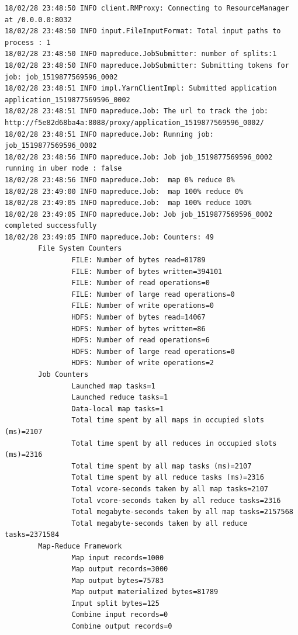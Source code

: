 \begin{lstlisting}
18/02/28 23:48:50 INFO client.RMProxy: Connecting to ResourceManager at /0.0.0.0:8032
18/02/28 23:48:50 INFO input.FileInputFormat: Total input paths to process : 1
18/02/28 23:48:50 INFO mapreduce.JobSubmitter: number of splits:1
18/02/28 23:48:50 INFO mapreduce.JobSubmitter: Submitting tokens for job: job_1519877569596_0002
18/02/28 23:48:51 INFO impl.YarnClientImpl: Submitted application application_1519877569596_0002
18/02/28 23:48:51 INFO mapreduce.Job: The url to track the job: http://f5e82d68ba4a:8088/proxy/application_1519877569596_0002/
18/02/28 23:48:51 INFO mapreduce.Job: Running job: job_1519877569596_0002
18/02/28 23:48:56 INFO mapreduce.Job: Job job_1519877569596_0002 running in uber mode : false
18/02/28 23:48:56 INFO mapreduce.Job:  map 0% reduce 0%
18/02/28 23:49:00 INFO mapreduce.Job:  map 100% reduce 0%
18/02/28 23:49:05 INFO mapreduce.Job:  map 100% reduce 100%
18/02/28 23:49:05 INFO mapreduce.Job: Job job_1519877569596_0002 completed successfully
18/02/28 23:49:05 INFO mapreduce.Job: Counters: 49
        File System Counters
                FILE: Number of bytes read=81789
                FILE: Number of bytes written=394101
                FILE: Number of read operations=0
                FILE: Number of large read operations=0
                FILE: Number of write operations=0
                HDFS: Number of bytes read=14067
                HDFS: Number of bytes written=86
                HDFS: Number of read operations=6
                HDFS: Number of large read operations=0
                HDFS: Number of write operations=2
        Job Counters
                Launched map tasks=1
                Launched reduce tasks=1
                Data-local map tasks=1
                Total time spent by all maps in occupied slots (ms)=2107
                Total time spent by all reduces in occupied slots (ms)=2316
                Total time spent by all map tasks (ms)=2107
                Total time spent by all reduce tasks (ms)=2316
                Total vcore-seconds taken by all map tasks=2107
                Total vcore-seconds taken by all reduce tasks=2316
                Total megabyte-seconds taken by all map tasks=2157568
                Total megabyte-seconds taken by all reduce tasks=2371584
        Map-Reduce Framework
                Map input records=1000
                Map output records=3000
                Map output bytes=75783
                Map output materialized bytes=81789
                Input split bytes=125
                Combine input records=0
                Combine output records=0

\end{lstlisting}
